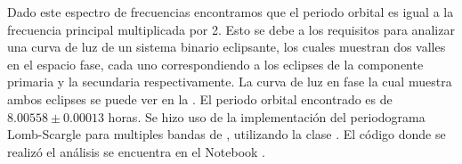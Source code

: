Dado este espectro de frecuencias encontramos que el periodo orbital es igual a
la frecuencia principal multiplicada por 2. Esto se debe a los requisitos para
analizar una curva de luz de un sistema binario eclipsante, los cuales muestran
dos valles en el espacio fase, cada uno correspondiendo a los eclipses de la
componente primaria y la secundaria respectivamente. La curva de luz en fase la
cual muestra ambos eclipses se puede ver en la
. El periodo orbital encontrado es de
$8.00558 \pm 0.00013$ horas. Se hizo uso de la implementación del periodograma
Lomb-Scargle para multiples bandas de , utilizando la clase
\href{https://docs.astropy.org/en/stable/timeseries/lombscarglemb.html}{}.
El código donde se realizó el análisis se encuentra en el Notebook
\href{https://github.com/KnightIV/UANL_MAPTA_Observaciones/blob/main/analisis/period-analysis/periodogram.ipynb}{}.

